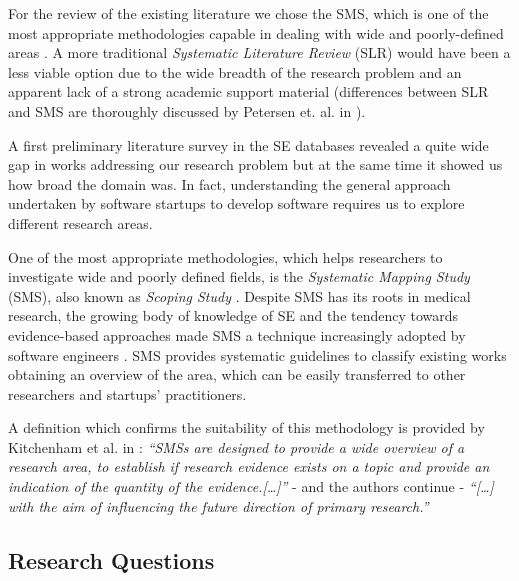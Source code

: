 \documentclass[final,5p,times,twocolumn]{elsarticle}
\begin{document}
For the review of the existing literature we chose the SMS, which is one of the most appropriate methodologies capable in dealing with wide and poorly-defined areas \cite{Petersen2007,Kitchenham2007}. A more traditional  \textit{Systematic Literature Review} (SLR) \cite{Kitchenham2007} would have been a less viable option due to the wide breadth of the research problem and an apparent lack of a strong academic support material (differences between SLR and SMS are thoroughly discussed  by Petersen et. al. in \cite{Petersen2007}).

A first preliminary literature survey in the SE databases revealed a quite wide gap in works addressing our research problem but at the same time it showed us how broad the domain was. In fact, understanding the general approach undertaken by software startups to develop software requires us to explore different research areas.

One of the most appropriate methodologies, which helps researchers to investigate wide and poorly defined fields, is the \textit{Systematic Mapping Study} (SMS), also known as  \textit{Scoping Study} \cite{Kitchenham2007}. Despite SMS has its roots in medical research, the growing body of knowledge of SE and the tendency towards evidence-based approaches \cite{Dyba2006} made SMS a technique increasingly adopted by software engineers \cite{Budgen2007}. SMS provides systematic guidelines to classify existing works obtaining an overview of the area, which can be easily transferred to other researchers and startups’ practitioners.

A definition which confirms the suitability of this methodology is provided by Kitchenham et al. in \cite{Kitchenham2007}:  \textit{``SMSs are designed to provide a wide overview of a research area, to establish if research evidence exists on a topic and provide an indication of the quantity of the evidence.[\ldots]''} - and the authors continue - \textit{``[\ldots] with the aim of influencing the future direction of primary research.''}

\subsection{Research Questions} %
\label{sub:rq}
\end{document}
